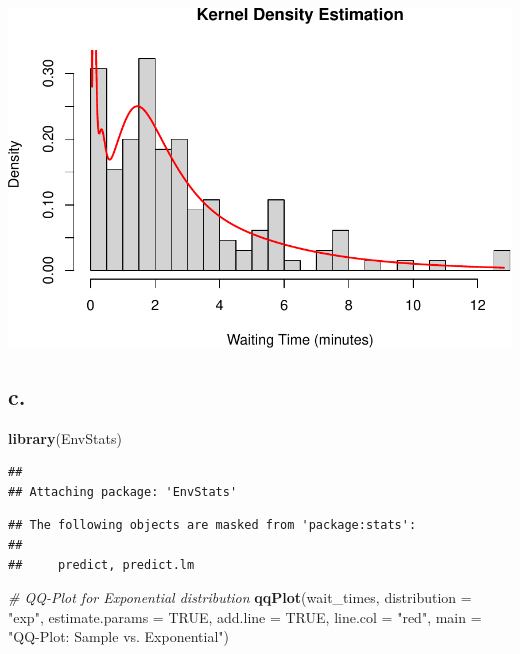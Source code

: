 \documentclass[
]{article}
\newenvironment{Shaded}{\begin{snugshade}}{\end{snugshade}}
\newcommand{\AttributeTok}[1]{\textcolor[rgb]{0.13,0.29,0.53}{#1}}
\newcommand{\CommentTok}[1]{\textcolor[rgb]{0.56,0.35,0.01}{\textit{#1}}}
\newcommand{\ConstantTok}[1]{\textcolor[rgb]{0.56,0.35,0.01}{#1}}
\newcommand{\FunctionTok}[1]{\textcolor[rgb]{0.13,0.29,0.53}{\textbf{#1}}}
\newcommand{\NormalTok}[1]{#1}
\newcommand{\StringTok}[1]{\textcolor[rgb]{0.31,0.60,0.02}{#1}}
\begin{document}
\includegraphics{SDA_submission_template_files/figure-latex/unnamed-chunk-3-1.pdf}

\subsection{c.}\label{c.-1}

\begin{Shaded}
\begin{Highlighting}[]
\FunctionTok{library}\NormalTok{(EnvStats)}
\end{Highlighting}
\end{Shaded}

\begin{verbatim}
## 
## Attaching package: 'EnvStats'
\end{verbatim}

\begin{verbatim}
## The following objects are masked from 'package:stats':
## 
##     predict, predict.lm
\end{verbatim}

\begin{Shaded}
\begin{Highlighting}[]
\CommentTok{\# QQ{-}Plot for Exponential distribution}
\FunctionTok{qqPlot}\NormalTok{(wait\_times, }\AttributeTok{distribution =} \StringTok{"exp"}\NormalTok{, }\AttributeTok{estimate.params =} \ConstantTok{TRUE}\NormalTok{, }\AttributeTok{add.line =} \ConstantTok{TRUE}\NormalTok{, }\AttributeTok{line.col =} \StringTok{"red"}\NormalTok{, }\AttributeTok{main =} \StringTok{"QQ{-}Plot: Sample vs. Exponential"}\NormalTok{)}
\end{Highlighting}
\end{Shaded}
\end{document}
